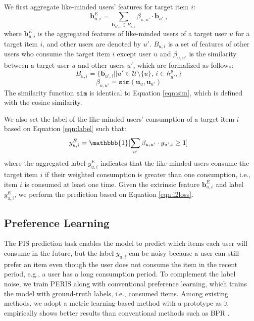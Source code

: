 \documentclass[sigconf]{acmart}
\newcommand{\MD}{{\small\textsf{PERIS}}}
\begin{document}
We first aggregate like-minded users' features for target item $i$:
\begin{equation*}
    \textbf{b}_{u,i}^E= \sum_{\textbf{b}_{u',i} \in B_{u,i}} \beta_{u, u'} \cdot \textbf{b}_{u',i}
\end{equation*}
where $\textbf{b}_{u,i}^E$ is the aggregated features of like-minded users of a target user $u$ for a target item $i$, and other users are denoted by $u'$. $B_{u,i}$ is a set of features of other users who consume the target item $i$ except user $u$ and $\beta_{u, u'}$ is the similarity between a target user $u$ and other users $u'$, which are formalized as follows:
\begin{equation*}
    B_{u,i} = \{ \textbf{b}_{u',i}|| u' \in \mathcal{U} \setminus{\{u\}}, \, i \in h_{u'}^p, \}
\end{equation*}
\begin{equation*}
    \beta_{u,u'} = \texttt{sim}(\textbf{u}_u, \textbf{u}_{u'})
\end{equation*}
The similarity function $\mathtt{sim}$ is identical to Equation \ref{eqn:sim}, which is defined with the cosine similarity. 

We also set the label of the like-minded users' consumption of a target item $i$ based on Equation \ref{eqn:label} such that:
\begin{equation}
    y_{u,i}^E = \mathbbb{1}[\sum_{u'} \beta_{u, u'} \cdot y_{u',i} \ge 1]
\end{equation}
where the aggregated label $y_{u,i}^E$ indicates that the like-minded users consume the target item $i$ if their weighted consumption is greater than one consumption, i.e., item $i$ is consumed at least one time. 
Given the extrinsic feature $\textbf{b}_{u,i}^E$ and label $y_{u,i}^E$, we perform the prediction based on Equation \ref{eqn:l2loss}.






\subsection{Preference Learning}
\label{sec:pref}
The PIS prediction task enables the model to predict which items each user will consume in the future, but the label $y_{u,i}$ can be noisy because a user can still prefer an item even though the user does not consume the item in the recent period, e.g., a user has a long consumption period. To complement the label noise, we train \MD{} along with conventional preference learning, which trains the model with ground-truth labels, i.e., consumed items. 
Among existing methods, we adopt a metric learning-based method with a prototype \cite{movshovitz2017no, hyun2020interest} as it empirically shows better results than conventional methods such as BPR \cite{mnih2008probabilistic}.
\end{document}
